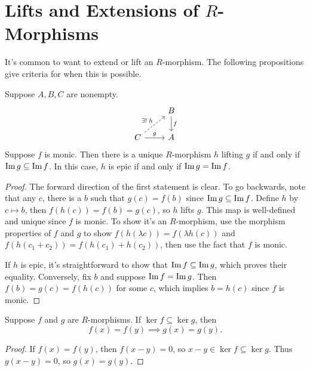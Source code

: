 \documentclass[twoside,10pt]{report}
\begin{document}
\section{Lifts and Extensions of \texorpdfstring{$R$}{R}-Morphisms}

It's common to want to extend or lift an $R$-morphism. The following propositions give criteria for when this is possible.

\begin{prop}
	\label{prop:unique-lift}
Suppose $A, B, C$ are nonempty.
\[
\begin{tikzcd}
	& B \dar{f} \\
	C \arrow[ur, dashed, "\exists! \;h"] \rar{g} & A
\end{tikzcd}
\] 
Suppose $f$ is monic. Then there is a unique $R$-morphism $h$ lifting $g$ if and only if $\operatorname{Im} g \subseteq \operatorname{Im} f$. In this case, $h$ is epic if and only if $\operatorname{Im} g = \operatorname{Im} f$.
\end{prop}
\begin{proof}
	The forward direction of the first statement is clear. To go backwards, note that any $c$, there is a $b$ such that $g(c) = f(b)$ since $\operatorname{Im} g \subseteq \operatorname{Im} f$. Define $h$ by $c \mapsto b$, then $f(h(c)) = f(b)=g(c)$, so $h$ lifts $g$. This map is well-defined and unique since $f$ is monic. To show it's an $R$-morphism, use the morphism properties of $f$ and $g$ to show $f(h(\lambda c)) = f(\lambda h(c))$ and $f(h(c_1+c_2)) = f(h(c_1)+h(c_2))$, then use the fact that $f$ is monic.

	If $h$ is epic, it's straightforward to show that $\operatorname{Im} f \subseteq \operatorname{Im} g$, which proves their equality. Conversely, fix $b$ and suppose $\operatorname{Im} f = \operatorname{Im} g$. Then $f(b) = g(c) = f(h(c))$ for some $c$, which implies $b = h(c)$ since $f$ is monic.
\end{proof}

\begin{lem}
Suppose $f$ and $g$ are $R$-morphisms. If $\ker f \subseteq \ker g$, then
\[
	f(x) = f(y) \implies g(x) = g(y).
\] 
\end{lem}
\begin{proof}
	If $f(x) = f(y)$, then $f(x-y)=0$, so $x-y \in \ker f \subseteq \ker g$. Thus $g(x-y) = 0$, so $g(x)=g(y)$.
\end{proof}
\end{document}
